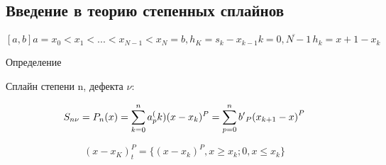 \subsection{Введение в теорию степенных сплайнов}

\[ [a, b] a = x_0 < x_1 < ... < x_{N-1} < x_N = b, h_K = s_k - x_{k-1} k = \overline{0, N-1}\, h_k = x+1 - x_k\]

Определение

Сплайн степени n, дефекта $ \nu $:

\[ S_{n\nu} = P_n (x) = \sum\limits_{k=0}^{n} a_p^(k) (x-x_k)^P = \sum\limits_{p = 0}^{n} {b'}_P{(x_{k+1} - x)}^P \]

\[ (x - x_K)^P_t = \{ (x - x_k)^P, x \geq x_k; 0, x \leq x_k \} \]

\newpage